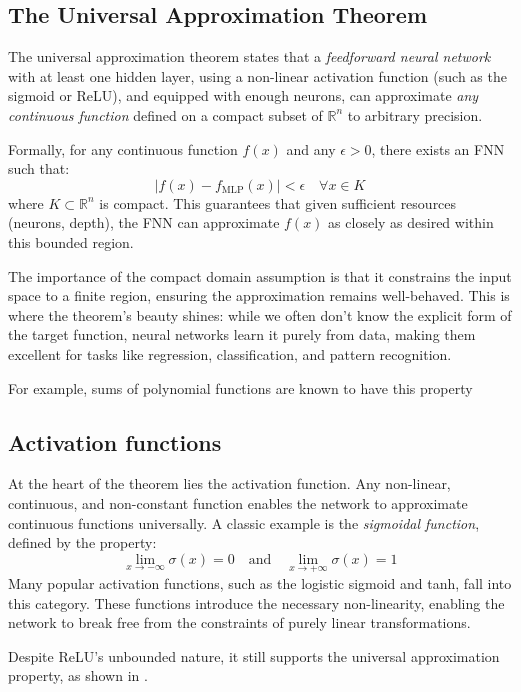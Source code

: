 \documentclass{article}
\theoremstyle{definition}
\theoremstyle{remark}
\newcounter{ct}
\begin{document}
\subsection{The Universal Approximation Theorem}
The universal approximation theorem states that a \textit{feedforward neural network} with at least one hidden layer, using a non-linear activation function (such as the sigmoid or ReLU), and equipped with enough neurons, can approximate \textit{any continuous function} defined on a compact subset of \(\mathbb{R}^n\) to arbitrary precision.

Formally, for any continuous function \(f(x)\) and any \(\epsilon > 0\), there exists an FNN such that:
\[
| f(x) - f_{\text{MLP}}(x) | < \epsilon \quad \forall x \in K
\]
where \(K \subset \mathbb{R}^n\) is compact. This guarantees that given sufficient resources (neurons, depth), the FNN can approximate \(f(x)\) as closely as desired within this bounded region.

The importance of the compact domain assumption is that it constrains the input space to a finite region, ensuring the approximation remains well-behaved.	
This is where the theorem’s beauty shines: while we often don’t know the explicit form of the target function, neural networks learn it purely from data, making them excellent for tasks like regression, classification, and pattern recognition.

 For example, sums of polynomial functions are known to have this property\citep{llavona1986approximation}

\subsection{Activation functions} %
At the heart of the theorem lies the activation function. Any non-linear, continuous, and non-constant function enables the network to approximate continuous functions universally.
A classic example is the \textit{sigmoidal function}, defined by the property:
\[
\lim_{x \to -\infty} \sigma(x) = 0 \quad \text{and} \quad \lim_{x \to +\infty} \sigma(x) = 1
\]
Many popular activation functions, such as the logistic sigmoid and tanh, fall into this category.
These functions introduce the necessary non-linearity, enabling the network to break free from the constraints of purely linear transformations.

Despite ReLU's unbounded nature, it still supports the universal approximation property, as shown in \citep{yarotsky2017error}.
\end{document}
